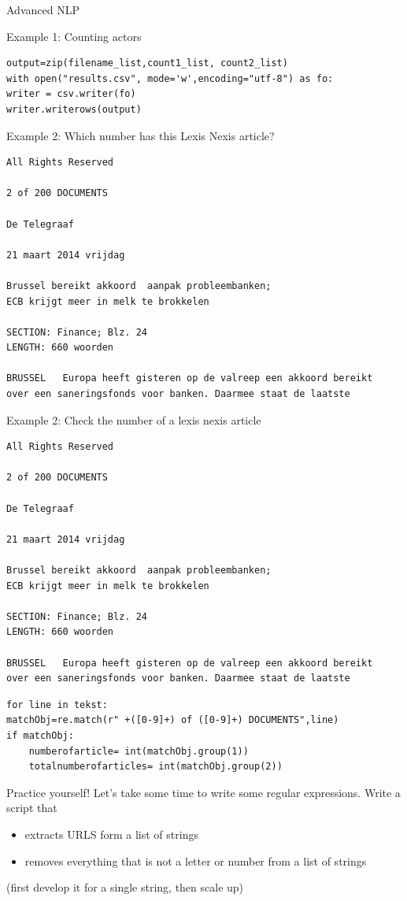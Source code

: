 \documentclass[compress]{beamer}
\begin{document}
\begin{section}{Advanced NLP}
\begin{frame}{Example 1: Counting actors}
\begin{lstlisting}
output=zip(filename_list,count1_list, count2_list)
with open("results.csv", mode='w',encoding="utf-8") as fo:
writer = csv.writer(fo)
writer.writerows(output)
\end{lstlisting}
\end{frame}




\begin{frame}[fragile]{Example 2: Which number has this Lexis Nexis article?}
\begin{lstlisting}
All Rights Reserved

2 of 200 DOCUMENTS

De Telegraaf

21 maart 2014 vrijdag

Brussel bereikt akkoord  aanpak probleembanken;
ECB krijgt meer in melk te brokkelen

SECTION: Finance; Blz. 24
LENGTH: 660 woorden

BRUSSEL   Europa heeft gisteren op de valreep een akkoord bereikt 
over een saneringsfonds voor banken. Daarmee staat de laatste
\end{lstlisting}

\end{frame}

\begin{frame}[fragile]{Example 2: Check the number of a lexis nexis article}
\begin{lstlisting}
All Rights Reserved

2 of 200 DOCUMENTS

De Telegraaf

21 maart 2014 vrijdag

Brussel bereikt akkoord  aanpak probleembanken;
ECB krijgt meer in melk te brokkelen

SECTION: Finance; Blz. 24
LENGTH: 660 woorden

BRUSSEL   Europa heeft gisteren op de valreep een akkoord bereikt 
over een saneringsfonds voor banken. Daarmee staat de laatste
\end{lstlisting}

\begin{lstlisting}
for line in tekst:
matchObj=re.match(r" +([0-9]+) of ([0-9]+) DOCUMENTS",line)
if matchObj:
    numberofarticle= int(matchObj.group(1))
    totalnumberofarticles= int(matchObj.group(2))
\end{lstlisting}
\end{frame}


\begin{frame}{Practice yourself!}
Let's take some time to write some regular expressions.
Write a script that
\begin{itemize}
\item extracts URLS form a list of strings
\item removes everything that is not a letter or number from a list of strings
\end{itemize}
(first develop it for a single string, then scale up)


\end{frame}
\end{section}
\end{document}
